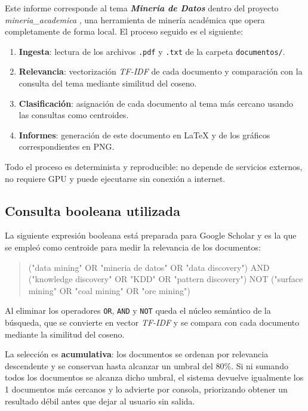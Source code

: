\documentclass[11pt,a4paper]{article}
\newcommand{\tema}[1]{\textbf{\textit{#1}}}
\newcommand{\pcento}{\%}
\begin{document}
Este informe corresponde al tema \tema{ Mineria de Datos } dentro del
proyecto \textit{ mineria\_academica }, una herramienta de minería académica que
opera completamente de forma local. El proceso seguido es el siguiente:

\begin{enumerate}
  \item \textbf{Ingesta}: lectura de los archivos \texttt{.pdf} y
        \texttt{.txt} de la carpeta \texttt{documentos/}.
  \item \textbf{Relevancia}: vectorización \textit{TF-IDF} de cada documento
        y comparación con la consulta del tema mediante similitud del coseno.
  \item \textbf{Clasificación}: asignación de cada documento al tema más
        cercano usando las consultas como centroides.
  \item \textbf{Informes}: generación de este documento en \LaTeX{} y de los
        gráficos correspondientes en PNG.
\end{enumerate}

Todo el proceso es determinista y reproducible: no depende de servicios
externos, no requiere GPU y puede ejecutarse sin conexión a internet.

\subsection{Consulta booleana utilizada}
\label{sec:query}

La siguiente expresión booleana está preparada para Google Scholar y es la que
se empleó como centroide para medir la relevancia de los documentos:

\begin{quote}
\small\ttfamily
("data mining" OR "mineria de datos" OR "data discovery") AND ("knowledge discovery" OR "KDD" OR "pattern discovery") NOT ("surface mining" OR "coal mining" OR "ore mining")
\end{quote}

Al eliminar los operadores \texttt{OR}, \texttt{AND} y \texttt{NOT} queda el
núcleo semántico de la búsqueda, que se convierte en vector \textit{TF-IDF} y
se compara con cada documento mediante la similitud del coseno.

La selección es \textbf{acumulativa}: los documentos se ordenan por relevancia
descendente y se conservan hasta alcanzar un umbral del
80\pcento. Si ni sumando todos los documentos se alcanza
dicho umbral, el sistema devuelve igualmente los 1
documentos más cercanos y lo advierte por consola, priorizando obtener un
resultado débil antes que dejar al usuario sin salida.
\end{document}
